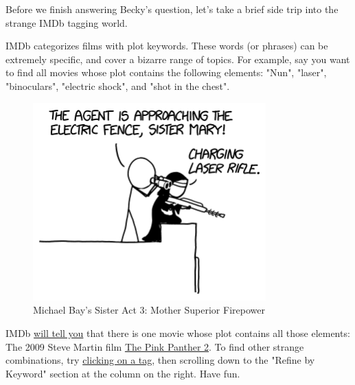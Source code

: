 {{Before we finish answering Becky's question, let's take a brief side trip into the strange IMDb tagging world.}

{IMDb categorizes films with plot keywords. These words (or phrases) can be extremely specific, and cover a bizarre range of topics. For example, say you want to find all movies whose plot contains the following elements: "Nun", "laser", "binoculars", "electric shock", and "shot in the chest".}

\begin{figure}[!htbp]
\centering
\includegraphics[scale=0.5, max width=0.8\textwidth]{imgs/a/100/nun.png}
\caption{Michael Bay's Sister Act 3: Mother Superior Firepower}
\end{figure}

{IMDb \href{http://www.imdb.com/keyword/nun/laser/binoculars/electric-shock/shot-in-the-chest/}{will tell you} that there is one movie whose plot contains all those elements: The 2009 Steve Martin film \href{http://www.imdb.com/title/tt0838232/}{The Pink Panther 2}. To find other strange combinations, try \href{http://www.imdb.com/keyword/sword-fight/} {clicking on a tag}, then scrolling down to the "Refine by Keyword" section at the column on the right. Have fun.}

}
